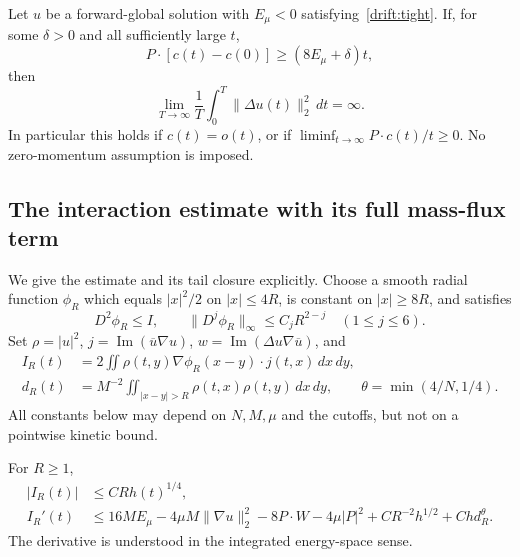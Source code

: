\begin{theorem}\label{drift:growth}
Let $u$ be a forward-global solution with $E_\mu<0$ satisfying~\eqref{drift:tight}. If, for some $\delta>0$ and all sufficiently large $t$,
\begin{equation}\label{drift:slow}
 P\cdot[c(t)-c(0)]\ge(8E_\mu+\delta)t,
\end{equation}
then
\begin{equation}\label{drift:divergence}
 \lim_{T\to\infty}\frac1T\int_0^T\|\Delta u(t)\|_2^2\,dt=\infty.
\end{equation}
In particular this holds if $c(t)=o(t)$, or if
$\liminf_{t\to\infty}P\cdot c(t)/t\ge0$. No zero-momentum assumption is imposed.
\end{theorem}

\subsection{The interaction estimate with its full mass-flux term}

We give the estimate and its tail closure explicitly. Choose a smooth radial function $\phi_R$ which equals $|x|^2/2$ on $|x|\le4R$, is constant on $|x|\ge8R$, and satisfies
\[
 D^2\phi_R\le I,\qquad
 \|D^j\phi_R\|_\infty\le C_jR^{2-j}\quad(1\le j\le6).
\]
Set $\rho=|u|^2$, $j=\operatorname{Im}(\overline u\nabla u)$, $w=\operatorname{Im}(\Delta u\nabla\overline u)$, and
\begin{align*}
 I_R(t)&=2\iint\rho(t,y)\nabla\phi_R(x-y)\cdot j(t,x)\,dx\,dy,\\
 d_R(t)&=M^{-2}\iint_{|x-y|>R}\rho(t,x)\rho(t,y)\,dx\,dy,
 \qquad \theta=\min(4/N,1/4).
\end{align*}
All constants below may depend on $N,M,\mu$ and the cutoffs, but not on a pointwise kinetic bound.

\begin{lemma}\label{drift:interaction}
For $R\ge1$,
\begin{align}
 |I_R(t)|&\le C R h(t)^{1/4},\label{drift:endpoint}\\
 I_R'(t)&\le16ME_\mu-4\mu M\|\nabla u\|_2^2
             -8P\cdot W-4\mu|P|^2
             +C R^{-2}h^{1/2}+C h d_R^\theta.
 \label{drift:virial}
\end{align}
The derivative is understood in the integrated energy-space sense.
\end{lemma}

